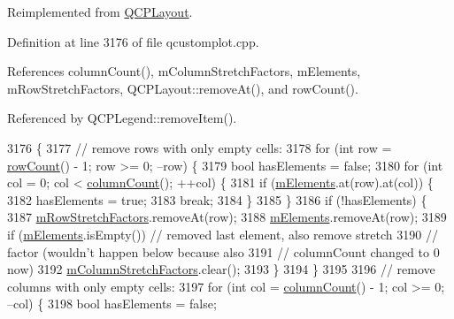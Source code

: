 Reimplemented from \hyperlink{class_q_c_p_layout_a41e6ac049143866e8f8b4964efab01b2}{Q\+C\+P\+Layout}.



Definition at line 3176 of file qcustomplot.\+cpp.



References column\+Count(), m\+Column\+Stretch\+Factors, m\+Elements, m\+Row\+Stretch\+Factors, Q\+C\+P\+Layout\+::remove\+At(), and row\+Count().



Referenced by Q\+C\+P\+Legend\+::remove\+Item().


\begin{DoxyCode}
3176                              \{
3177   \textcolor{comment}{// remove rows with only empty cells:}
3178   \textcolor{keywordflow}{for} (\textcolor{keywordtype}{int} row = \hyperlink{class_q_c_p_layout_grid_af8e6c7a05864ebe610c87756c7b9079c}{rowCount}() - 1; row >= 0; --row) \{
3179     \textcolor{keywordtype}{bool} hasElements = \textcolor{keyword}{false};
3180     \textcolor{keywordflow}{for} (\textcolor{keywordtype}{int} col = 0; col < \hyperlink{class_q_c_p_layout_grid_ac39074eafd148b82d0762090f258189e}{columnCount}(); ++col) \{
3181       \textcolor{keywordflow}{if} (\hyperlink{class_q_c_p_layout_grid_a2ec4664bcfb5d479255e50f0c074f7c9}{mElements}.at(row).at(col)) \{
3182         hasElements = \textcolor{keyword}{true};
3183         \textcolor{keywordflow}{break};
3184       \}
3185     \}
3186     \textcolor{keywordflow}{if} (!hasElements) \{
3187       \hyperlink{class_q_c_p_layout_grid_a36c85a7eaf342680fb9b8a4977486f16}{mRowStretchFactors}.removeAt(row);
3188       \hyperlink{class_q_c_p_layout_grid_a2ec4664bcfb5d479255e50f0c074f7c9}{mElements}.removeAt(row);
3189       \textcolor{keywordflow}{if} (\hyperlink{class_q_c_p_layout_grid_a2ec4664bcfb5d479255e50f0c074f7c9}{mElements}.isEmpty()) \textcolor{comment}{// removed last element, also remove stretch}
3190                                \textcolor{comment}{// factor (wouldn't happen below because also}
3191                                \textcolor{comment}{// columnCount changed to 0 now)}
3192         \hyperlink{class_q_c_p_layout_grid_ac6aabe62339f94f18b9f8adab94b1840}{mColumnStretchFactors}.clear();
3193     \}
3194   \}
3195 
3196   \textcolor{comment}{// remove columns with only empty cells:}
3197   \textcolor{keywordflow}{for} (\textcolor{keywordtype}{int} col = \hyperlink{class_q_c_p_layout_grid_ac39074eafd148b82d0762090f258189e}{columnCount}() - 1; col >= 0; --col) \{
3198     \textcolor{keywordtype}{bool} hasElements = \textcolor{keyword}{false};

\end{DoxyCode}
